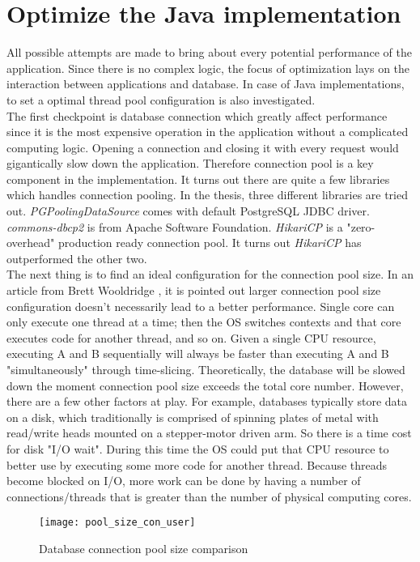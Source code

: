 \section{Optimize the Java implementation}
All possible attempts are made to bring about every potential performance of the application. Since there is no complex logic, the focus of optimization lays on the interaction between applications and database. In case of Java implementations, to set a optimal thread pool configuration is also investigated. \\
The first checkpoint is database connection which greatly affect performance since it is the most expensive operation in the application without a complicated computing logic. Opening a connection and closing it with every request would gigantically slow down the application. Therefore connection pool is a key component in the implementation. It turns out there are quite a few libraries which handles connection pooling. In the thesis,  three different libraries are tried out. \textit{PGPoolingDataSource}  \citep{pgpool}   comes with default PostgreSQL JDBC driver. \textit{commons-dbcp2} \citep{dbcp} is from Apache Software Foundation. \textit{HikariCP} is a "zero-overhead" production ready connection pool. It turns out \textit{HikariCP} \citep{hikari} has outperformed the other two. \\
The next thing is to find an ideal configuration for the connection pool size. In an article from Brett Wooldridge \citep{poolsize}, it is pointed out larger connection pool size configuration doesn't necessarily lead to a better performance. Single core can only execute one thread at a time; then the OS switches contexts and that core executes code for another thread, and so on. Given a single CPU resource, executing A and B sequentially will always be faster than executing A and B "simultaneously" through time-slicing. Theoretically, the database will be slowed down the moment connection pool size exceeds the total core number. However, there are a few other factors at play. For example, databases typically store data on a disk, which traditionally is comprised of spinning plates of metal with read/write heads mounted on a stepper-motor driven arm. So there is a time cost for disk "I/O wait". During this time the OS could put that CPU resource to better use by executing some more code for another thread. Because threads become blocked on I/O,  more work can be done by having a number of connections/threads that is greater than the number of physical computing cores.
\begin{figure}[h]
	\centering
	\texttt{[image: pool\_size\_con\_user]}
	\caption{Database connection pool size comparison}
	\label{pool-comparison}
\end{figure}
